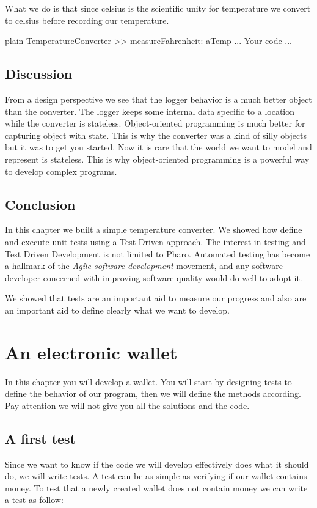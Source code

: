 \documentclass[10pt,twoside,english]{_support/latex/sbabook/sbabook}
\begin{document}
What we do is that since celsius is the scientific unity for temperature we convert to celsius before recording our temperature. 

\begin{displaycode}{plain}
TemperatureConverter >> measureFahrenheit: aTemp
	... Your code ...
\end{displaycode}
\section{Discussion }
From a design perspective we see that the logger behavior is a much better object than the converter. The logger keeps some internal data specific to a location while the converter is stateless. Object-oriented programming is much better for capturing object with state. This is why the converter was a kind of silly objects but it was to get you started. 
Now it is rare that the world we want to model and represent is stateless. This is why object-oriented programming is a powerful way to develop complex programs.
\section{Conclusion}
In this chapter we built a simple temperature converter. We showed how define and execute unit tests using a Test Driven approach. The interest in testing and Test Driven Development is not limited to Pharo. Automated testing has become a hallmark of the \textit{Agile software development} movement, and any software developer concerned with improving
software quality would do well to adopt it.

We showed that tests are an important aid to measure our progress and also are an important aid to define clearly what we want to develop.

\chapter{An electronic wallet}\label{cha:wallet}
In this chapter you will develop a wallet. You will start by designing tests to define the behavior of our program, then we will define the methods according. Pay attention we will not give you all the solutions and the code.
\section{A first test}
Since we want to know if the code we will develop effectively does what it should do, we will write tests. 
A test can be as simple as verifying if our wallet contains money. To test that a newly created wallet does 
not contain money we can write a test as follow:
\end{document}
